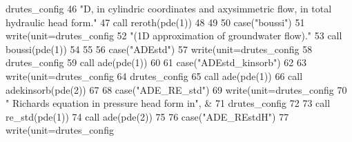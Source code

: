\begin{DoxyCode}
      drutes_config%
46 \textcolor{comment}{          }\textcolor{stringliteral}{"D, in cylindric coordinates and axysimmetric flow, in total hydraulic head form."}
47           \textcolor{keyword}{call }reroth(pde(1))
48         
49               
50         \textcolor{keywordflow}{case}(\textcolor{stringliteral}{"boussi"})   
51            \textcolor{keyword}{write}(unit=drutes_config%
52 \textcolor{comment}{           }\textcolor{stringliteral}{"(1D approximation of groundwater flow)."}
53            \textcolor{keyword}{call }boussi(pde(1))
54            
55         
56         \textcolor{keywordflow}{case}(\textcolor{stringliteral}{"ADEstd"}) 
57           \textcolor{keyword}{write}(unit=drutes_config%
58 \textcolor{comment}{           drutes_config%
59            \textcolor{keyword}{call }ade(pde(1))
60 
61       \textcolor{keywordflow}{case}(\textcolor{stringliteral}{"ADEstd\_kinsorb"})
62       
63           \textcolor{keyword}{write}(unit=drutes_config%
64 \textcolor{comment}{           drutes_config%
65            \textcolor{keyword}{call }ade(pde(1))
66            \textcolor{keyword}{call }adekinsorb(pde(2))
67            
68       \textcolor{keywordflow}{case}(\textcolor{stringliteral}{"ADE\_RE\_std"})
69           \textcolor{keyword}{write}(unit=drutes_config%
70 \textcolor{comment}{          }\textcolor{stringliteral}{"  Richards equation in pressure head form in"}, &
71            drutes_config%
72 \textcolor{comment}{           }
73 \textcolor{comment}{           }\textcolor{keyword}{call }re_std(pde(1))
74            \textcolor{keyword}{call }ade(pde(2))
75         
76       \textcolor{keywordflow}{case}(\textcolor{stringliteral}{"ADE\_REstdH"})
77           \textcolor{keyword}{write}(unit=drutes_config%
}}
\end{DoxyCode}
